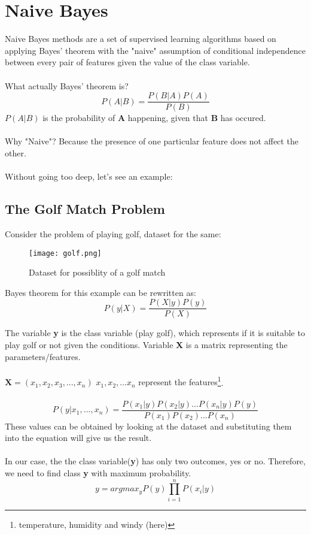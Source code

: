 \section{Naive Bayes}

Naive Bayes methods are a set of supervised learning algorithms based on applying Bayes' theorem with the "naive" assumption of conditional independence between every pair of features given the value of the class variable.\\ \\
What actually Bayes' theorem is?
\begin{equation}\label {eq:bayes}
    P(A|B) = \frac{P(B|A)P(A)}{P(B)}
\end{equation}
$P(A|B)$ is the probability of \textbf{A} happening, given that \textbf{B} has occured.\\ \\ Why "Naive"? Because the presence of one particular feature does not affect the other.
\\ \\ 
Without going too deep, let's see an example:

\subsection{The Golf Match Problem}
    Consider the problem of playing golf, dataset for the same:
    \begin{figure}[h]
        \centering
        \texttt{[image: golf.png]}
        \caption{Dataset for possiblity of a golf match}
    \end{figure}

    Bayes theorem for this example can be rewritten as:
    \begin{equation}
        P(y|X) = \frac{P(X|y)P(y)}{P(X)}
    \end{equation}

    The variable \textbf{y} is the class variable (play golf), which represents if it is suitable to play golf or not given the conditions. Variable \textbf{X} is a matrix representing the parameters/features.
    \\ \\
    $\textbf{X} = (x_1, x_2, x_3, ... , x_n)$ \hfill    \small{$x_1, x_2, ... x_n$ represent the features}\footnote[1]{temperature, humidity and windy (here)}.
    \\ \\

    \begin{equation}
        P(y|x_1, ..., x_n) = \frac{P(x_1|y)P(x_2|y)...P(x_n|y)P(y)}{P(x_1)P(x_2)...P(x_n)}
    \end{equation}
    These values can be obtained by looking at the dataset and substituting them into the equation will give us the result.
    \\ \\
    In our case, the the class variable(\textbf{y}) has only two outcomes, yes or no. Therefore, we need to find class \textbf{y} with maximum probability. 
    \begin{equation}
        y = argmax_yP(y)\prod_{i=1}^{n}P(x_i|y)
    \end{equation}

